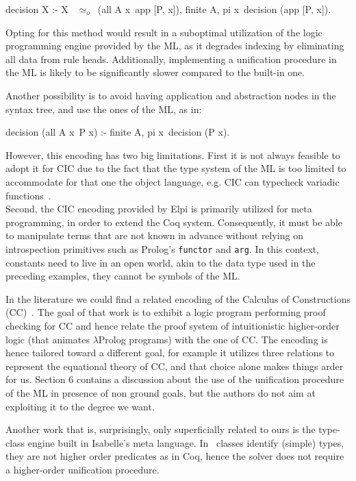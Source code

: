 \documentclass[sigconf,natbib=false,review]{acmart}
\newcommand{\UnifRel}{\ensuremath{\simeq}}
\newcommand{\Uo}{\texorpdfstring{\ensuremath{\UnifRel_o}\xspace}{unif\_o}}
\begin{document}
\begin{elpicode}
  decision X :- X ~\Uo~(all A x\ app [P, x]), finite A,
    pi x\ decision (app [P, x]).
\end{elpicode}

\noindent
Opting for this method would result in a suboptimal utilization of the logic
programming engine provided by the ML, as it degrades indexing by
eliminating all data from rule heads. Additionally,
implementing a unification procedure in the ML is likely to be significantly
slower compared to the built-in one.

Another possibility is to avoid having application and abstraction nodes
in the syntax tree, and use the ones of the ML, as in:

\begin{elpicode}
decision (all A x\ P x) :- finite A, pi x\ decision (P x).
\end{elpicode}

\noindent
However, this encoding has two big limitations. First it is
not always feasible to adopt it for CIC due to the fact that the type system
of the ML is too limited to accommodate for that one the object language,
e.g. CIC can typecheck variadic functions~\cite{cpdt}. \\
Second, the CIC encoding provided by Elpi is primarily utilized for meta
programming, in order to extend the Coq system. Consequently, it must be able to
manipulate terms that are not known in advance
without relying on introspection primitives such as Prolog's
\texttt{functor} and \texttt{arg}. In this context, constants need to live in
an open world, akin to the  data type used in the preceding
examples, they cannot be symbols of the ML.

In the literature we could find a related encoding of the Calculus of
Constructions (CC)~\cite{felty93lics}. The goal of that work is to exhibit
a logic program performing proof checking for CC and hence relate the
proof system of intuitionistic higher-order logic (that animates $\lambda$Prolog
programs) with the one of CC. The encoding is hence tailored
toward a different goal, for example it utilizes three relations to represent the
equational theory of CC, and that choice alone makes things arder for us.
Section 6 contains a discussion about the use of the
unification procedure of the ML in presence of non ground goals, but
the authors do not aim at exploiting it to the degree we want.

Another work that is, surprisingly, only superficially related to ours is the
type-class engine built in Isabelle's meta language. In~\cite{wenzel97}
classes identify (simple) types, they are not higher order predicates
as in Coq, hence the solver does not require a higher-order unification
procedure.
\end{document}
